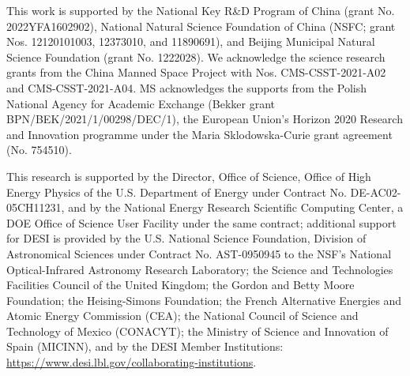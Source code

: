 \documentclass[twocolumn]{aastex631}
\begin{document}
\begin{acknowledgments}
This work is supported by the National Key R\&D Program of China (grant No. 2022YFA1602902), National Natural Science Foundation of China (NSFC; grant Nos. 12120101003, 12373010, and 11890691), and Beijing Municipal Natural Science Foundation (grant No. 1222028). We acknowledge the science research grants from the China Manned Space Project with Nos. CMS-CSST-2021-A02 and CMS-CSST-2021-A04. MS acknowledges the supports from the Polish National Agency for Academic Exchange (Bekker grant BPN/BEK/2021/1/00298/DEC/1), the European Union's Horizon 2020 Research and Innovation programme under the Maria Sklodowska-Curie grant agreement (No. 754510).

This research is supported by the Director, Office of Science, Office of High Energy Physics of the U.S. Department of Energy under Contract No. DE-AC02-05CH11231, and by the National Energy Research Scientific Computing Center, a DOE Office of Science User Facility under the same contract; additional support for DESI is provided by the U.S. National Science Foundation, Division of Astronomical Sciences under Contract No. AST-0950945 to the NSF’s National Optical-Infrared Astronomy Research Laboratory; the Science and Technologies Facilities Council of the United Kingdom; the Gordon and Betty Moore Foundation; the Heising-Simons Foundation; the French Alternative Energies and Atomic Energy Commission (CEA); the National Council of Science and Technology of Mexico (CONACYT); the Ministry of Science and Innovation of Spain (MICINN), and by the DESI Member Institutions: \url{https://www.desi.lbl.gov/collaborating-institutions}.


\end{acknowledgments}
\end{document}
